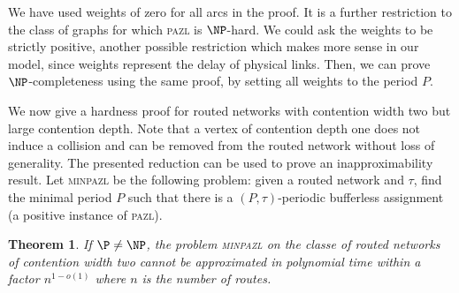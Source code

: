 \documentclass[a4paper,10pt]{journal}
\newtheorem{theorem}{Theorem}
\newcommand\pazl{\textsc{pazl}\xspace}
\newcommand\minpazl{\textsc{minpazl}\xspace}
\begin{document}
 We have used weights of zero for all arcs in the proof. It is a further restriction to the 
 class of graphs for which \pazl is $\NP$-hard. We could ask the weights to be strictly positive, another possible restriction which makes more sense in our model, since weights represent the delay of physical links. Then, we can prove $\NP$-completeness using the same proof, by setting all weights to the period $P$.

We now give a hardness proof for routed networks with contention width two but large contention depth. Note that a vertex of contention depth one does not induce a collision and can be removed from the routed network without loss of generality. The presented reduction can be used to prove an inapproximability result. Let \minpazl be the following problem: given a routed network and $\tau$, find the minimal period $P$ such that there is a $(P,\tau)$-periodic bufferless assignment (a positive instance of \pazl). 


\begin{theorem}\label{th:inapprox}
If $\P \neq \NP$, the problem \minpazl on the classe of routed networks of contention width two cannot be approximated in polynomial time within a factor $n^{1-o(1)}$ where $n$ is the number of routes.
\end{theorem}
\end{document}
